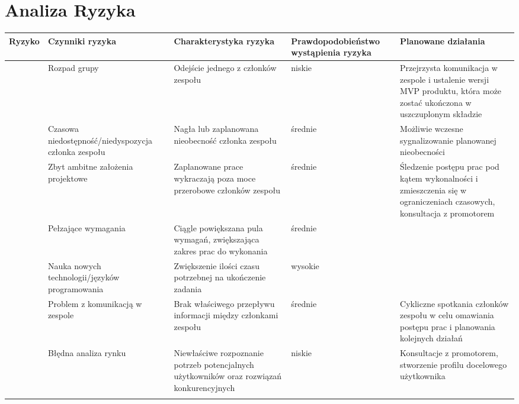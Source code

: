 

\section{Analiza Ryzyka}
\label{subsec:analiza-ryzyka}

\pagebreak
\begin{longtable}{|p{.1\linewidth}|p{}|p{}|p{}|p{}|}
    \hline
    Ryzyko & Czynniki ryzyka & Charakterystyka ryzyka & Prawdopodobieństwo wystąpienia ryzyka & Planowane działania \\
    \hline
    \multirow{6}{=}{\parbox[c]{11cm}{}}& Rozpad grupy & Odejście jednego z członków zespołu & niskie 
    & Przejrzysta komunikacja w zespole i ustalenie wersji MVP produktu, która może zostać ukończona w uszczuplonym składzie \\
    \cline{2-5}
     & Czasowa niedostępność/niedyspozycja członka zespołu & Nagła lub zaplanowana nieobecność członka zespołu & średnie 
     & Możliwie wczesne sygnalizowanie planowanej nieobecności \\
     \cline{2-5}
     & Zbyt ambitne założenia projektowe & Zaplanowane prace wykraczają poza moce przerobowe członków zespołu & średnie
    & Śledzenie postępu prac pod kątem wykonalności i zmieszczenia się w ograniczeniach czasowych, konsultacja z promotorem \\
    \cline{2-5}
     & Pełzające wymagania & Ciągle powiększana pula wymagań, zwiększająca zakres prac do wykonania & średnie & \\
     \cline{2-5}
     & Nauka nowych technologii/języków programowania & Zwiększenie ilości czasu potrzebnej na ukończenie zadania & 
     wysokie & \\
     \cline{2-5}
     & Problem z komunikacją w zespole & Brak właściwego przepływu informacji między członkami zespołu & średnie
     & Cykliczne spotkania członków zespołu w celu omawiania postępu prac i planowania kolejnych działań \\
    \hline
    \multirow{5}{=}{\parbox[c]{10cm}{}} & Błędna analiza rynku & Niewłaściwe rozpoznanie potrzeb potencjalnych użytkowników oraz rozwiązań konkurencyjnych & niskie
     & Konsultacje z promotorem, stworzenie profilu docelowego użytkownika \\
     \cline{2-5}

\end{longtable}
